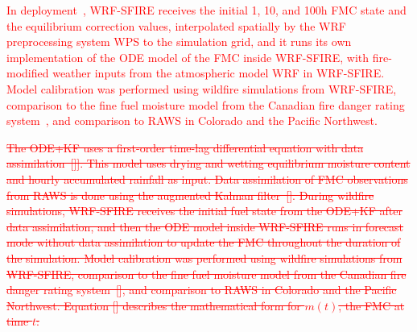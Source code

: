 \documentclass[fire,article,submit,pdftex,moreauthors]{Definitions/mdpi}
\begin{document}
\textcolor{red}{In deployment~\cite{Mandel-2019-IDH}, WRF-SFIRE receives the initial 1, 10, and 100h FMC state and the equilibrium correction values, interpolated spatially by the WRF preprocessing system WPS to the simulation grid, and it runs its own implementation of the ODE model of the FMC inside WRF-SFIRE, with fire-modified weather inputs from the atmospheric model WRF in WRF-SFIRE. Model calibration was performed using wildfire simulations from WRF-SFIRE, comparison to the fine fuel moisture model from the Canadian fire danger rating system~\citep{VanWagner-1985-EFP}, and comparison to RAWS in Colorado and the Pacific Northwest.}

\textcolor{red}{\sout{The ODE+KF uses a first-order time-lag differential equation with data assimilation~[]]. This model uses drying and wetting equilibrium moisture content and hourly accumulated rainfall as input. Data assimilation of FMC observations from RAWS is done using the augmented Kalman filter~[]. During wildfire simulations, WRF-SFIRE receives the initial fuel state from the ODE+KF after data assimilation, and then the ODE model inside WRF-SFIRE runs in forecast mode without data assimilation to update the FMC throughout the duration of the simulation. Model calibration was performed using wildfire simulations from WRF-SFIRE, comparison to the fine fuel moisture model from the Canadian fire danger rating system~[], and comparison to RAWS in Colorado and the Pacific Northwest. Equation [] describes the mathematical form for $m(t)$, the FMC at time $t$:}}
\end{document}
